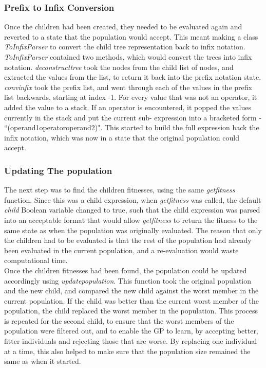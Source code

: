 \documentclass[11pt]{article}
\begin{document}
\subsubsection{Prefix to Infix Conversion}\label{subsubsec:P2I}
Once the children had been created, they needed to be evaluated again and reverted to a state that the population would accept. This meant making a class \textit{ToInfixParser} to convert the child tree representation back to infix notation. 
\textit{ToInfixParser} contained two methods, which would convert the trees into infix notation. \textit{deconstruct\textunderscore tree} took the nodes from the child list of nodes, and extracted the values from the list, to return it back into the prefix notation state. 
\textit{conv\textunderscore infix} took the prefix list, and went through each of the values in the prefix list backwards, starting at index -1. For every value that was not an operator, it added the value to a stack. If an operator is encountered, it popped the values currently in the stack and put the current sub- expression into a bracketed form - ``(\textlangle{}operand1\textrangle{}\textlangle{}operator\textrangle{}\textlangle{}operand2\textrangle{})". This started to build the full expression back the infix notation, which was now in a state that the original population could accept.
\subsubsection{Updating The population}\label{subsubsec:UP}
The next step was to find the children fitnesses, using the same \textit{get\textunderscore fitness} function. Since this was a child expression, when \textit{get\textunderscore fitness} was called, the default \textit{child} Boolean variable changed to true, such that the child expression was parsed into an acceptable format that would allow \textit{get\textunderscore fitness} to return the fitness to the same state as when the population was originally evaluated. The reason that only the children had to be evaluated is that the rest of the population had already been evaluated in the current population, and a re-evaluation would waste computational time.  \\

Once the children fitnesses had been found, the population could be updated accordingly using \textit{update\textunderscore population}. This function took the original population and the new child, and compared the new child against the worst member in the current population. If the child was better than the current worst member of the population, the child replaced the worst member in the population. This process is repeated for the second child, to ensure that the worst members of the population were filtered out, and to enable the GP to learn, by accepting better, fitter individuals and rejecting those that are worse. By replacing one individual at a time, this also helped to make sure that the population size remained the same as when it started. 
\end{document}
